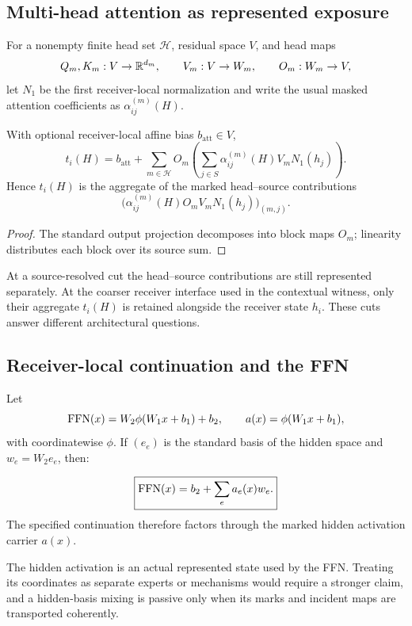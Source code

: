 \subsection{Multi-head attention as represented exposure}

For a nonempty finite head set $\mathcal H$, residual space $V$, and head maps
\[
Q_m,K_m:V\to\mathbb{R}^{d_m},
\qquad
V_m:V\to W_m,
\qquad
O_m:W_m\to V,
\]
let $N_1$ be the first receiver-local normalization and write the usual masked attention coefficients as $\alpha_{ij}^{(m)}(H)$.

\begin{proposition}\label{prop:multihead-v13}
With optional receiver-local affine bias $b_{\mathrm{att}}\in V$,
\[
\boxed{
t_i(H)=b_{\mathrm{att}}+
\sum_{m\in\mathcal H}O_m
\left(\sum_{j\in S}\alpha_{ij}^{(m)}(H)V_mN_1(h_j)\right).}
\]
Hence $t_i(H)$ is the aggregate of the marked head--source contributions
\[
\bigl(\alpha_{ij}^{(m)}(H)O_mV_mN_1(h_j)\bigr)_{(m,j)}.
\]
\end{proposition}

\begin{proof}
The standard output projection decomposes into block maps $O_m$; linearity distributes each block over its source sum.
\end{proof}

At a source-resolved cut the head--source contributions are still represented separately. At the coarser receiver interface used in the contextual witness, only their aggregate $t_i(H)$ is retained alongside the receiver state $h_i$. These cuts answer different architectural questions.

\subsection{Receiver-local continuation and the FFN}

Let
\[
\operatorname{FFN}(x)=W_2\phi(W_1x+b_1)+b_2,
\qquad
a(x)=\phi(W_1x+b_1),
\]
with coordinatewise $\phi$. If $(e_e)$ is the standard basis of the hidden space and $w_e=W_2e_e$, then:

\begin{proposition}\label{prop:ffn-v13}
\[
\boxed{\operatorname{FFN}(x)=b_2+\sum_e a_e(x)w_e.}
\]
The specified continuation therefore factors through the marked hidden activation carrier $a(x)$.
\end{proposition}

The hidden activation is an actual represented state used by the FFN. Treating its coordinates as separate experts or mechanisms would require a stronger claim, and a hidden-basis mixing is passive only when its marks and incident maps are transported coherently.

